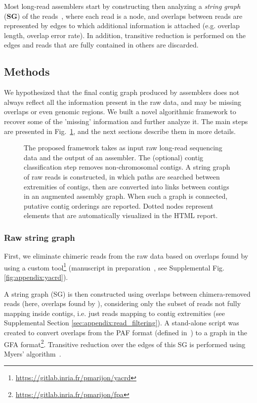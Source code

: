 \documentclass[./main.tex]{subfiles}
\newcommand{\modafterreview}[1]{#1}
\begin{document}
Most long-read assemblers \modafterreview{start by constructing then analyzing} a \emph{string graph} (\textbf{SG}) of the reads~\citep{myers2005fragment}, where each read is a node, and overlaps between reads are represented by edges to which additional information is attached (e.g. overlap length, overlap error rate). In addition, transitive reduction is performed on the edges and reads \modafterreview{that are fully contained in others} are discarded.

\subsection{Methods}

We hypothesized that the final contig graph produced by assemblers does not always reflect all the information present in the raw data, and may be missing overlaps or \modafterreview{even} genomic regions.
We built a novel \modafterreview{algorithmic} framework to recover some of the 'missing' information and further analyze it. The main steps are presented in Fig.~\ref{fg:framework_presentation}, and the next sections describe them in more details. 


\begin{figure}[!tpb]
    \centering
    
    \caption{The proposed framework takes as input raw long-read sequencing data and the output of an assembler. The \modafterreview{(optional)} contig classification step removes non-chromosomal contigs. A string graph of raw reads is constructed, in which paths are searched between extremities of contigs, then are converted into links between contigs in an augmented assembly graph. When such a graph is connected, putative contig orderings are reported. \modafterreview{Dotted nodes represent elements that are automatically visualized in the HTML report.}}
    \label{fg:framework_presentation}
\end{figure}

\subsubsection{Raw string graph}

First, we eliminate chimeric reads from the raw data based on overlaps found by \minimap using a custom tool\footnote{\small \url{https://gitlab.inria.fr/pmarijon/yacrd}} (manuscript in preparation~\citep{yacrd}, see Supplemental Fig. \ref{fig:appendix:yacrd}).
\modafterreview{
A string graph (SG) is then constructed using overlaps between \modafterreview{chimera-removed} reads \modafterreview{(here, overlaps found by \minimap)}, considering only the subset of reads not fully mapping inside contigs, i.e. just reads mapping to contig extremities (see Supplemental Section \ref{sec:appendix:read_filtering}).
} %
A stand-alone script was created to convert overlaps from the PAF format (defined in~\cite{miniasm}) to a graph in the GFA format\footnote{\small \url{https://gitlab.inria.fr/pmarijon/fpa}}. 
Transitive reduction over the edges of this SG is performed using Myers' algorithm~\citep{myers2005fragment}.
\end{document}
